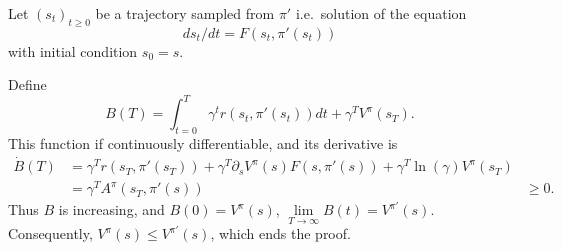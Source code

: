 Let $(s_t)_{t\geq 0}$ be a trajectory sampled from $\pi'$ i.e.\ solution of the equation
\begin{equation}
	ds_t / dt = F(s_t, \pi'(s_t))
\end{equation}
with initial condition $s_0 = s$.

Define
\begin{equation}
	B(T) = \int_{t=0}^T \gamma^t r(s_t, \pi'(s_t)) dt + \gamma^T V^\pi(s_T).
\end{equation}
This function if continuously differentiable, and its derivative is
\begin{align}
	\dot{B}(T) &= \gamma^T r(s_T, \pi'(s_T)) + \gamma^T \partial_s V^\pi(s) F(s, \pi'(s)) + \gamma^T \ln(\gamma) V^\pi(s_T)\\
		   &= \gamma^T A^\pi(s_T, \pi'(s))
		   &\geq 0.
\end{align}
Thus $B$ is increasing, and $B(0) = V^\pi(s)$, $\lim\limits_{T\rightarrow \infty} B(t) = V^{\pi'}(s)$.
Consequently, $V^\pi(s) \leq V^{\pi'}(s)$, which ends the proof.

